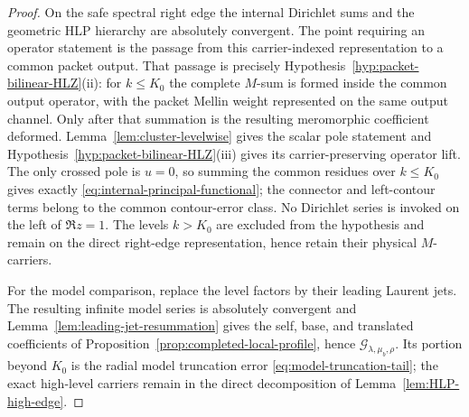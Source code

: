 \begin{proof}
On the safe spectral right edge the internal Dirichlet sums and the geometric
HLP hierarchy are absolutely convergent.  The point requiring an operator
statement is the passage from this carrier-indexed representation to a common
packet output.  That passage is precisely Hypothesis~\ref{hyp:packet-bilinear-HLZ}(ii):
for $k\le K_0$ the complete $M$-sum is formed inside the common output operator,
with the packet Mellin weight represented on the same output channel.  Only
after that summation is the resulting meromorphic coefficient deformed.
Lemma~\ref{lem:cluster-levelwise} gives the scalar pole statement and
Hypothesis~\ref{hyp:packet-bilinear-HLZ}(iii) gives its carrier-preserving
operator lift.  The only crossed pole is $u=0$, so summing the common residues
over $k\le K_0$ gives exactly
\eqref{eq:internal-principal-functional}; the connector and left-contour terms
belong to the common contour-error class.  No Dirichlet series is invoked on
the left of $\Re z=1$.  The levels $k>K_0$ are excluded from the hypothesis and
remain on the direct right-edge representation, hence retain their physical
$M$-carriers.

For the model comparison, replace the level factors by their leading Laurent
jets. The resulting infinite model series is absolutely convergent and
Lemma~\ref{lem:leading-jet-resummation} gives the self, base, and translated
coefficients of Proposition~\ref{prop:completed-local-profile}, hence
$\mathscr G_{\lambda,\mu_b,\rho}$. Its portion beyond $K_0$ is the radial model
truncation error \eqref{eq:model-truncation-tail}; the exact high-level carriers
remain in the direct decomposition of Lemma~\ref{lem:HLP-high-edge}.
\end{proof}
